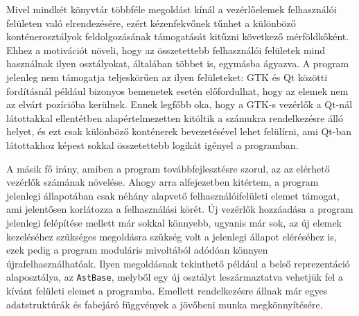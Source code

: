 Mivel mindkét könyvtár többféle megoldást kínál a vezérlőelemek felhasználói felületen való elrendezésére, ezért kézenfekvőnek tűnhet a különböző konténerosztályok feldolgozásának támogatását kitűzni következő mérföldkőként. Ehhez a motivációt növeli, hogy az összetettebb felhasználói felületek mind használnak ilyen osztályokat, általában többet is, egymásba ágyazva. A program jelenleg nem támogatja teljeskörűen az ilyen felületeket: GTK és Qt közötti fordításnál például bizonyos bemenetek esetén előfordulhat, hogy az elemek nem az elvárt pozícióba kerülnek. Ennek legfőbb oka, hogy a GTK-s vezérlők a Qt-nál látottakkal ellentétben alapértelmezetten kitöltik a számukra rendelkezésre álló helyet, és ezt csak különböző konténerek bevezetésével lehet felülírni, ami Qt-ban látottakhoz képest sokkal összetettebb logikát igényel a programban.

A másik fő irány, amiben a program továbbfejlesztésre szorul, az az elérhető vezérlők számának növelése. Ahogy arra  alfejezetben kitértem, a program jelenlegi állapotában csak néhány alapvető felhasználóifelületi elemet támogat, ami jelentősen korlátozza a felhasználási körét. Új vezérlők hozzáadása a program jelenlegi felépítése mellett már sokkal könnyebb, ugyanis már sok, az új elemek kezeléséhez szükséges megoldásra szükség volt a jelenlegi állapot eléréséhez is, ezek pedig a program moduláris mivoltából adódóan könnyen újrafelhasználhatóak. Ilyen megoldásnak tekinthető például a belső reprezentáció alaposztálya, az \texttt{AstBase}, melyből egy új osztályt leszármaztatva vehetjük fel a kívánt felületi elemet a programba. Emellett rendelkezésre állnak már egyes adatstruktúrák és fabejáró függvények a jövőbeni munka megkönnyítésére.

